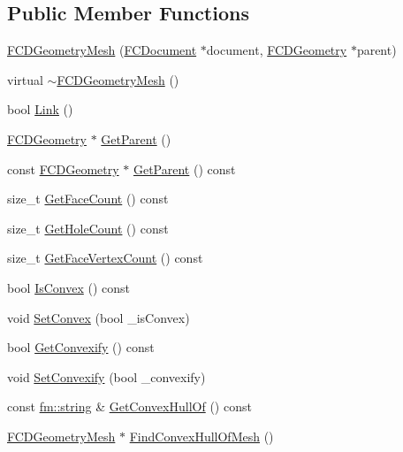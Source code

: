 \subsection*{Public Member Functions}
\begin{DoxyCompactItemize}
\item 
\hyperlink{classFCDGeometryMesh_a6f1c5510f106416551bd2c331f9ea022}{FCDGeometryMesh} (\hyperlink{classFCDocument}{FCDocument} $\ast$document, \hyperlink{classFCDGeometry}{FCDGeometry} $\ast$parent)
\item 
virtual \hyperlink{classFCDGeometryMesh_a062e400aac6ce055ed6db51231b3b537}{$\sim$FCDGeometryMesh} ()
\item 
bool \hyperlink{classFCDGeometryMesh_a2b87610eccdde4570945cc1c81e48366}{Link} ()
\item 
\hyperlink{classFCDGeometry}{FCDGeometry} $\ast$ \hyperlink{classFCDGeometryMesh_aa6c96b824ccc5d236ea22fa49233d33d}{GetParent} ()
\item 
const \hyperlink{classFCDGeometry}{FCDGeometry} $\ast$ \hyperlink{classFCDGeometryMesh_a3df8702d155a390893ae9f5c8d1cbee4}{GetParent} () const 
\item 
size\_\-t \hyperlink{classFCDGeometryMesh_a3c551f539e902eee84aa773a22d83c01}{GetFaceCount} () const 
\item 
size\_\-t \hyperlink{classFCDGeometryMesh_ae5f4ce74dcda45627dffdbfeb2125979}{GetHoleCount} () const 
\item 
size\_\-t \hyperlink{classFCDGeometryMesh_a86adc3c12dc416d492abd8a28e6a4977}{GetFaceVertexCount} () const 
\item 
bool \hyperlink{classFCDGeometryMesh_a3d32a446c2812954aa68ed6fd3249eae}{IsConvex} () const 
\item 
void \hyperlink{classFCDGeometryMesh_a46580a4255f7732b79d867bd9d401001}{SetConvex} (bool \_\-isConvex)
\item 
bool \hyperlink{classFCDGeometryMesh_a2769a84038bc95dfc3fc17ae310175b3}{GetConvexify} () const 
\item 
void \hyperlink{classFCDGeometryMesh_abe640e389233b31201a37379c7ee9925}{SetConvexify} (bool \_\-convexify)
\item 
const \hyperlink{classfm_1_1stringT}{fm::string} \& \hyperlink{classFCDGeometryMesh_a77c22ce44b86092efbee7e7fb46e3e93}{GetConvexHullOf} () const 
\item 
\hyperlink{classFCDGeometryMesh}{FCDGeometryMesh} $\ast$ \hyperlink{classFCDGeometryMesh_acf7ba1dc888c3eac17b80a19eddedd2f}{FindConvexHullOfMesh} ()
\item 

\end{DoxyCompactItemize}
